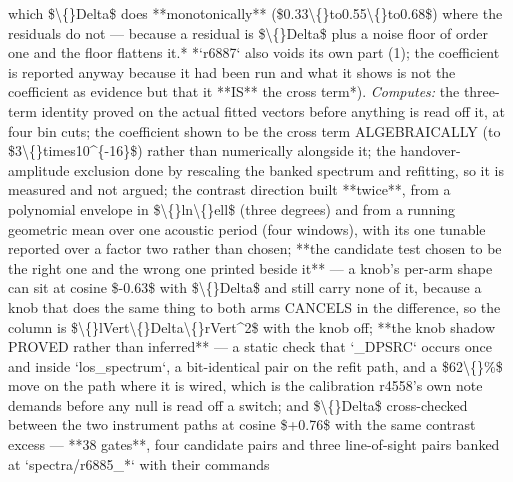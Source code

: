 \begin{description}
which \$\textbackslash\{\}Delta\$ does **monotonically** (\$0.33\textbackslash\{\}to0.55\textbackslash\{\}to0.68\$) where the residuals do not --- because a residual is \$\textbackslash\{\}Delta\$ plus a noise floor of order one and the floor flattens it.*  *`r6887` also voids its own part (1); the coefficient is reported anyway because it had been run and what it shows is not the coefficient as evidence but that it **IS** the cross term*). 
\emph{Computes:} the three-term identity proved on the actual fitted vectors before anything is read off it, at four bin cuts; the coefficient shown to be the cross term ALGEBRAICALLY (to \$3\textbackslash\{\}times10\textasciicircum{}\{-16\}\$) rather than numerically alongside it; the handover-amplitude exclusion done by rescaling the banked spectrum and refitting, so it is measured and not argued; the contrast direction built **twice**, from a polynomial envelope in \$\textbackslash\{\}ln\textbackslash\{\}ell\$ (three degrees) and from a running geometric mean over one acoustic period (four windows), with its one tunable reported over a factor two rather than chosen; **the candidate test chosen to be the right one and the wrong one printed beside it** --- a knob's per-arm shape can sit at cosine \$-0.63\$ with \$\textbackslash\{\}Delta\$ and still carry none of it, because a knob that does the same thing to both arms CANCELS in the difference, so the column is \$\textbackslash\{\}lVert\textbackslash\{\}Delta\textbackslash\{\}rVert\textasciicircum{}2\$ with the knob off; **the knob shadow PROVED rather than inferred** --- a static check that `\_DPSRC` occurs once and inside `los\_spectrum`, a bit-identical pair on the refit path, and a \$62\textbackslash\{\}\%\$ move on the path where it is wired, which is the calibration r4558's own note demands before any null is read off a switch; and \$\textbackslash\{\}Delta\$ cross-checked between the two instrument paths at cosine \$+0.76\$ with the same contrast excess --- **38 gates**, four candidate pairs and three line-of-sight pairs banked at `spectra/r6885\_*` with their commands

\end{description}
